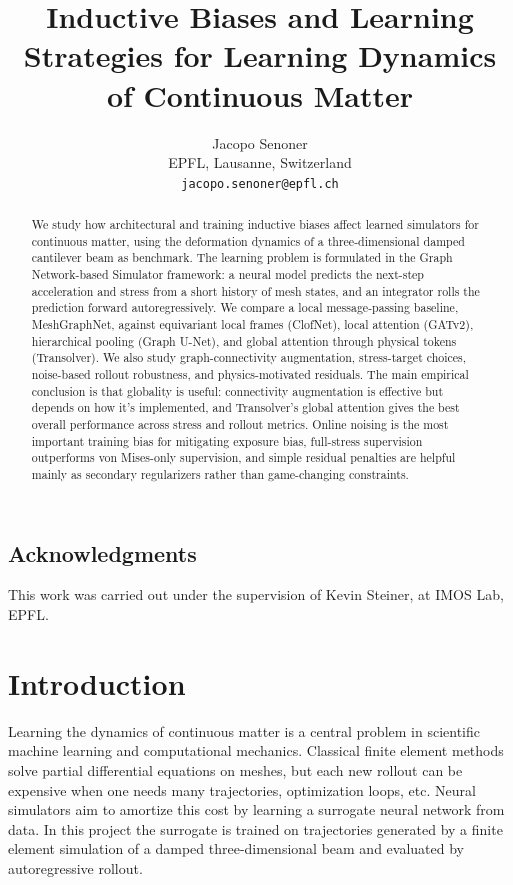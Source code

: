 \documentclass[11pt,a4paper,reqno]{amsart}
\title[Inductive Biases and Learning Strategies for Learning Dynamics of Continuous Matter]{%
Inductive Biases and Learning Strategies for Learning Dynamics of Continuous Matter%
}
\author[JACOPO SENONER]{%
Jacopo Senoner\\
{\scriptsize EPFL, Lausanne, Switzerland}\\
{\scriptsize \texttt{jacopo.senoner@epfl.ch}}%
}
\date{}
\theoremstyle{definition}
\theoremstyle{remark}
\numberwithin{equation}{section}
\begin{document}
\begin{abstract}
We study how architectural and training inductive biases affect learned simulators for continuous matter, using the deformation dynamics of a three-dimensional damped cantilever beam as benchmark. The learning problem is formulated in the Graph Network-based Simulator framework: a neural model predicts the next-step acceleration and stress from a short history of mesh states, and an integrator rolls the prediction forward autoregressively. We compare a local message-passing baseline, MeshGraphNet, against equivariant local frames (ClofNet), local attention (GATv2), hierarchical pooling (Graph U-Net), and global attention through physical tokens (Transolver). We also study graph-connectivity augmentation, stress-target choices, noise-based rollout robustness, and physics-motivated residuals. The main empirical conclusion is that globality is useful: connectivity augmentation is effective but depends on how it's implemented, and Transolver's global attention gives the best overall performance across stress and rollout metrics. Online noising is the most important training bias for mitigating exposure bias, full-stress supervision outperforms von Mises-only supervision, and simple residual penalties are helpful mainly as secondary regularizers rather than game-changing constraints.
\end{abstract}

\maketitle

\subsection*{Acknowledgments}

This work was carried out under the supervision of Kevin Steiner, at IMOS Lab, EPFL. 

\section{Introduction}
\label{sec:intro}

Learning the dynamics of continuous matter is a central problem in scientific machine learning and computational mechanics. Classical finite element methods solve partial differential equations on meshes, but each new rollout can be expensive when one needs many trajectories, optimization loops, etc. Neural simulators aim to amortize this cost by learning a surrogate neural network from data. In this project the surrogate is trained on trajectories generated by a finite element simulation of a damped three-dimensional beam and evaluated by autoregressive rollout.
\end{document}
